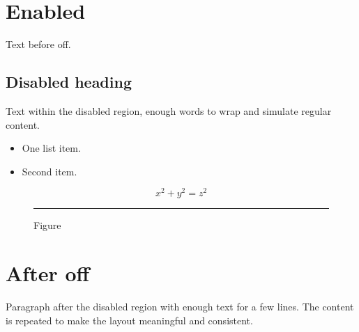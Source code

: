 \documentclass{article}
\begin{document}
\section{Enabled}
Text before off.
\begin{gridautoff}
\section{Disabled heading}
Text within the disabled region, enough words to wrap and simulate regular content.
\begin{itemize}\item One list item.\item Second item.\end{itemize}
\begin{equation}x^2+y^2=z^2\end{equation}
\begin{figure}[tb]\centering\rule{2cm}{1cm}\caption{Figure}\end{figure}
\end{gridautoff}
\section{After off}
Paragraph after the disabled region with enough text for a few lines. The content is repeated to make the layout meaningful and consistent.
\end{document}
